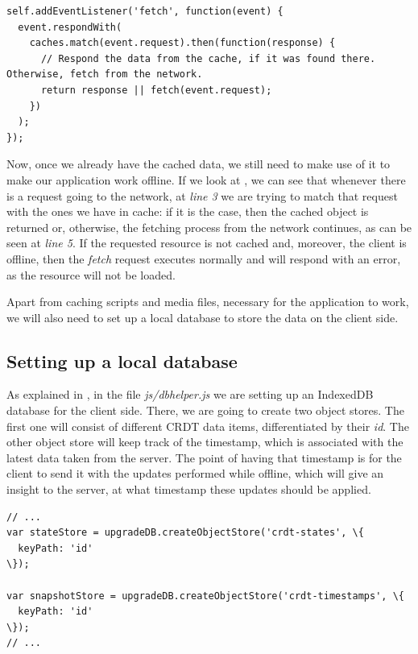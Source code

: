 \begin{lstlisting}[caption={Code for maintaining the requests of the application.}, label={lst:dev5}]
self.addEventListener('fetch', function(event) {
  event.respondWith(
    caches.match(event.request).then(function(response) {
      // Respond the data from the cache, if it was found there. Otherwise, fetch from the network.
      return response || fetch(event.request);
    })
  );
});
\end{lstlisting}

Now, once we already have the cached data, we still need to make use of it to make our application work offline. If we look at , we can see that whenever there is a request going to the network, at \textit{line 3} we are trying to match that request with the ones we have in cache: if it is the case, then the cached object is returned or, otherwise, the fetching process from the network continues, as can be seen at \textit{line 5}. If the requested resource is not cached and, moreover, the client is offline, then the \textit{fetch} request executes normally and will respond with an error, as the resource will not be loaded.

Apart from caching scripts and media files, necessary for the application to work, we will also need to set up a local database to store the data on the client side.

\subsection*{Setting up a local database}

As explained in , in the file \textit{js/dbhelper.js} we are setting up an IndexedDB database for the client side. There, we are going to create two object stores. The first one will consist of different CRDT data items, differentiated by their \textit{id}. The other object store will keep track of the timestamp, which is associated with the latest data taken from the server. The point of having that timestamp is for the client to send it with the updates performed while offline, which will give an insight to the server, at what timestamp these updates should be applied.

\begin{lstlisting}[caption={[Creating object stores in IndexedDB]Creating object stores in IndexedDB for CRDTs and timestamps.}, label={lst:dev6}]
// ...
var stateStore = upgradeDB.createObjectStore('crdt-states', \{
  keyPath: 'id'
\});

var snapshotStore = upgradeDB.createObjectStore('crdt-timestamps', \{
  keyPath: 'id'
\});
// ...
\end{lstlisting}

